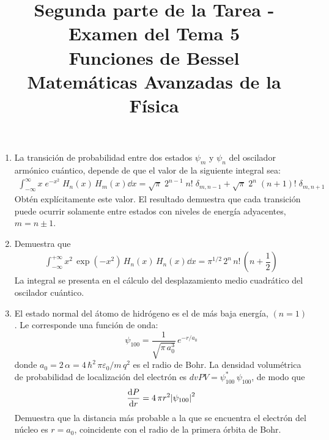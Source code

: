 
\author{}
\title{Segunda parte de la Tarea - Examen del Tema 5  \\ \large{Funciones de Bessel \\ Matemáticas Avanzadas de la Física}} \vspace{-1.5\baselineskip}
\date{ }

\vspace{-4cm}
\renewcommand\labelenumii{\theenumi.{\arabic{enumii})}}
\maketitle
\fontsize{14}{14}\selectfont
\begin{enumerate}
\item La transición de probabilidad entre dos estados $\psi_{m}$ y $\psi_{n}$ del oscilador armónico cuántico, depende de que el valor de la siguiente integral sea:
\begin{align*}
\int_{-\infty}^{\infty} x \; e^{-x^{2}} \; H_{n} (x) \, H_{m}(x) \dd{x} = \sqrt{\pi} \; 2^{n-1} \; n! \; \delta_{m,n-1} + \sqrt{\pi} \; 2^{n} \; (n+1)! \; \delta_{m,n+1}
\end{align*}
Obtén explícitamente este valor. El resultado demuestra que cada transición puede ocurrir solamente entre estados con niveles de energía adyacentes, $m = n \pm 1$.
\item Demuestra que
\begin{align*}
\int_{-\infty}^{+\infty} x^{2} \, \exp \left( -x^{2} \right) \, H_{n} (x) \, H_{n} (x) \dd{x} = \pi^{1/2} \, 2^{n} \, n! \, \left( n + \dfrac{1}{2} \right)
\end{align*}
La integral se presenta en el cálculo del desplazamiento medio cuadrático del oscilador cuántico.
\item El estado normal del átomo de hidrógeno es el de más baja energía, $(n = 1)$. Le corresponde una función de onda:
\[ \psi_{100} = \dfrac{1}{\sqrt{\pi \, a_{0}^{3}}} \, e^{-r/a_{0}}\]
donde $a_{0} = 2 \, \alpha = 4 \, \hbar^{2} \, \pi \varepsilon_{0}/ m \,q^{2}$ es el radio de Bohr. La densidad volumétrica de probabilidad de localización del electrón es $dv{P}{V} = \psi_{100}^{*} \, \psi_{100}$, de modo que 
\begin{align*}
\dv{P}{r} = 4 \, \pi r^{2} \abs{\psi_{100}}^{2}
\end{align*}
Demuestra que la distancia más probable a la que se encuentra el electrón del núcleo es $r = a_{0}$, coincidente con el radio de la primera órbita de Bohr.
\end{enumerate}
